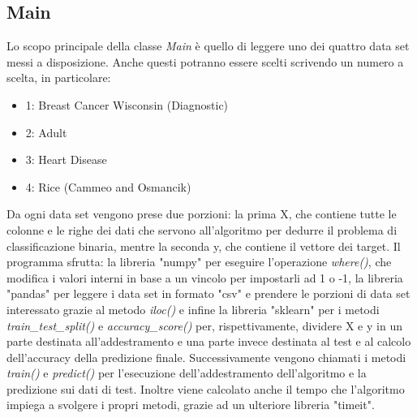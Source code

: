 \documentclass{article}
\begin{document}
    \subsection{Main}
	Lo scopo principale della classe \textit{Main} è quello di leggere uno dei quattro data set messi a disposizione. Anche questi potranno essere scelti scrivendo un numero a scelta, in particolare:
	\begin{itemize}
		\item 1: Breast Cancer Wisconsin (Diagnostic)
		\item 2: Adult
		\item 3: Heart Disease
		\item 4: Rice (Cammeo and Osmancik)
	\end{itemize}
	Da ogni data set vengono prese due porzioni: la prima X, che contiene tutte le colonne e le righe dei dati che servono all'algoritmo per dedurre il problema di classificazione binaria, mentre la seconda y, che contiene il vettore dei target. Il programma sfrutta: la libreria "numpy" per eseguire l'operazione \textit{where()}, che modifica i valori interni in base a un vincolo per impostarli ad 1 o -1, la libreria "pandas" per leggere i data set in formato "csv" e prendere le porzioni di data set interessato grazie al metodo \textit{iloc()} e infine la libreria "sklearn" per i metodi \textit{train\_test\_split()} e \textit{accuracy\_score()} per, rispettivamente, dividere X e y in un parte destinata all'addestramento e una parte invece destinata al test e al calcolo dell'accuracy della predizione finale.
	Successivamente vengono chiamati i metodi \textit{train()} e \textit{predict()} per l'esecuzione dell'addestramento dell'algoritmo e la predizione sui dati di test. Inoltre viene calcolato anche il tempo che l'algoritmo impiega a svolgere i propri metodi, grazie ad un ulteriore libreria "timeit".
\end{document}
